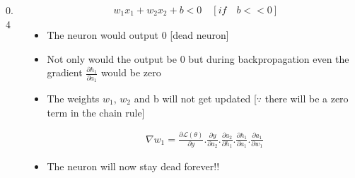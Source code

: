 \begin{frame}
	\begin{columns}
		
		\begin{column} {0.4\textwidth}
			\begin{center}
				
			\end{center}
		\end{column}
		
		\begin{column}{0.6\textwidth}
			\vspace{-0.2in}
			
			\begin{align*}
				w_{1}x_{1} +w_{2}x_{2} + b < 0 \quad [if \quad b<<0]
			\end{align*}
			\vspace{-0.2in}
			
			\begin{itemize}
				\justifying
				\item<1-> The neuron would output 0 [dead neuron]
				\item<2-> Not only would the output be 0 but during backpropagation even the gradient $\frac{\partial h_{1}}{\partial a_{1}}$ would be zero
				\item<3-> The weights $w_{1}$, $w_{2}$ and b will not get updated [$\because$ there will be a zero term in the chain rule]
				
				\begin{align*}
					\nabla w_1 =\frac{\partial\mathscr{L}(\theta)}{\partial y}.\frac{\partial y}{\partial a_{2}}.\frac{\partial a_{2}}{\partial h_{1}}.\frac{\partial h_{1}}{\partial a_{1}}.\frac{\partial a_{1}}{\partial w_{1}}
				\end{align*}
				
				\item<4-> The neuron will now stay dead forever!!
			\end{itemize}
			
		\end{column}
		
	\end{columns}
\end{frame}


